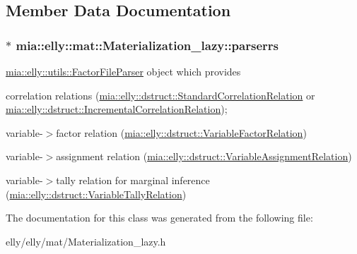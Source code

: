 \subsection{Member Data Documentation}
\hypertarget{classmia_1_1elly_1_1mat_1_1_materialization__lazy_a3425cb0aefa4c9423085c2b164aaacd4}{
\subsubsection[{parserrs}]{$\ast$ mia\-::elly\-::mat\-::\-Materialization\-\_\-lazy\-::parserrs}}\label{classmia_1_1elly_1_1mat_1_1_materialization__lazy_a3425cb0aefa4c9423085c2b164aaacd4}
\hyperlink{classmia_1_1elly_1_1utils_1_1_factor_file_parser}{mia\-::elly\-::utils\-::\-Factor\-File\-Parser} object which provides
\begin{DoxyItemize}
\item correlation relations (\hyperlink{classmia_1_1elly_1_1dstruct_1_1_standard_correlation_relation}{mia\-::elly\-::dstruct\-::\-Standard\-Correlation\-Relation} or \hyperlink{classmia_1_1elly_1_1dstruct_1_1_incremental_correlation_relation}{mia\-::elly\-::dstruct\-::\-Incremental\-Correlation\-Relation});
\item variable-\/$>$factor relation (\hyperlink{classmia_1_1elly_1_1dstruct_1_1_variable_factor_relation}{mia\-::elly\-::dstruct\-::\-Variable\-Factor\-Relation})
\item variable-\/$>$assignment relation (\hyperlink{classmia_1_1elly_1_1dstruct_1_1_variable_assignment_relation}{mia\-::elly\-::dstruct\-::\-Variable\-Assignment\-Relation})
\item variable-\/$>$tally relation for marginal inference (\hyperlink{classmia_1_1elly_1_1dstruct_1_1_variable_tally_relation}{mia\-::elly\-::dstruct\-::\-Variable\-Tally\-Relation}) 
\end{DoxyItemize}

The documentation for this class was generated from the following file\-:\begin{DoxyCompactItemize}
\item 
elly/elly/mat/Materialization\-\_\-lazy.\-h\end{DoxyCompactItemize}
